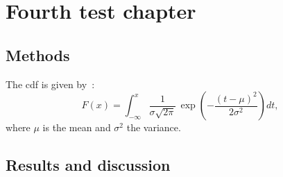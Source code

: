 \chapter{Fourth test chapter}
\clearpage

\section{Methods}
\lipsum[7-8]

The \ac{cdf} is given by~\cite{johnson2022, wilson2023}:
\begin{equation}
  F(x) = \int_{-\infty}^{x} \frac{1}{\sigma\sqrt{2\pi}}\,
         \exp\!\left(-\frac{(t-\mu)^2}{2\sigma^2}\right) dt,
\end{equation}
where $\mu$ is the mean and $\sigma^2$ the variance.
\lipsum[9]

\section{Results and discussion}
\lipsum[10-12]

\printbibliography[heading=subbibliography, title={References}]
